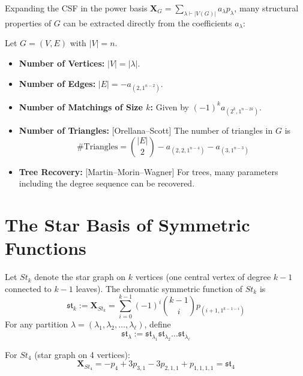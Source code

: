 \documentclass[12pt]{memoir}
\begin{document}
Expanding the CSF in the power basis $\mathbf{X}_G = \sum_{\lambda \vdash |V(G)|} a_\lambda p_\lambda$, many structural properties of $G$ can be extracted directly from the coefficients $a_\lambda$:

\begin{ptcb}
\begin{Prop}
Let $G = (V, E)$ with $|V| = n$.
\begin{itemize}
    \item \textbf{Number of Vertices:} $|V| = |\lambda|$.
    \item \textbf{Number of Edges:} $|E| = -a_{(2, 1^{n-2})}$.
    \item \textbf{Number of Matchings of Size $k$:} Given by $(-1)^k a_{(2^k, 1^{n-2k})}$.
    \item \textbf{Number of Triangles:} [Orellana--Scott] The number of triangles in $G$ is
    \[
    \text{\# Triangles} = \binom{|E|}{2} - a_{(2, 2, 1^{n-4})} - a_{(3, 1^{n-3})}
    \]
    \item \textbf{Tree Recovery:} [Martin--Morin--Wagner] For trees, many parameters including the degree sequence can be recovered.
\end{itemize}
\end{Prop}
\end{ptcb}

\newpage

\section{The Star Basis of Symmetric Functions}

\begin{ptcb}
\begin{Def}
Let $St_k$ denote the star graph on $k$ vertices (one central vertex of degree $k-1$ connected to $k-1$ leaves). The chromatic symmetric function of $St_k$ is
\[
\mathfrak{st}_k := \mathbf{X}_{St_k} = \sum_{i=0}^{k-1} (-1)^i \binom{k-1}{i} p_{(i+1, 1^{k-1-i})}
\]
For any partition $\lambda = (\lambda_1, \lambda_2, \dots, \lambda_\ell)$, define
\[
\mathfrak{st}_\lambda := \mathfrak{st}_{\lambda_1} \mathfrak{st}_{\lambda_2} \dots \mathfrak{st}_{\lambda_\ell}
\]
\end{Def}
\end{ptcb}

\begin{Ex}
For $St_4$ (star graph on 4 vertices):
\[
\mathbf{X}_{St_4} = -p_4 + 3 p_{3,1} - 3 p_{2,1,1} + p_{1,1,1,1} = \mathfrak{st}_4
\]
\end{Ex}
\end{document}
